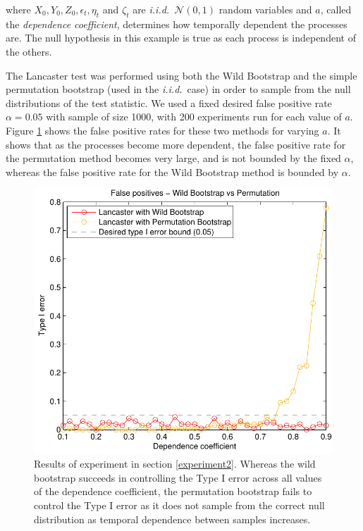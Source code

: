 \documentclass[]{article}
\begin{document}
where $X_0, Y_0, Z_0, \epsilon_t, \eta_t$ and $\zeta_t$ are \emph{i.i.d.}~$\mathcal{N}(0,1)$ random variables and $a$, called the \emph{dependence coefficient}, determines how temporally dependent the processes are. The null hypothesis in this example is true as each process is independent of the others.

The Lancaster test was performed using both the Wild Bootstrap and the simple permutation bootstrap (used in the \emph{i.i.d.}~case) in order to sample from the null distributions of the test statistic. We used a fixed desired false positive rate $\alpha = 0.05$ with sample of size 1000, with 200 experiments run for each value of $a$. Figure \ref{wildBootstrap_is_necessary} shows the false positive rates for these two methods for varying $a$. It shows that as the processes become more dependent, the false positive rate for the permutation method becomes very large, and is not bounded by the fixed $\alpha$, whereas the false positive rate for the Wild Bootstrap method is bounded by $\alpha$.
\begin{figure}[ht]
\vskip 0.2in
\begin{center}
\centerline{\includegraphics[scale=0.6]{UAI_Figure2.pdf}}
\caption{Results of experiment in section \ref{experiment2}. Whereas the wild bootstrap succeeds in controlling the Type I error across all values of the dependence coefficient, the permutation bootstrap fails to control the Type I error as it does not sample from the correct null distribution as temporal dependence between samples increases.}
\label{wildBootstrap_is_necessary}
\end{center}
\vskip -0.2in
\end{figure} 
\end{document}
